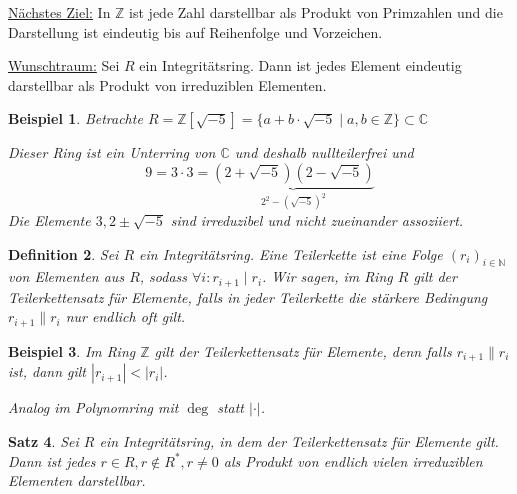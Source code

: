 \documentclass[a4paper,12pt,numbers=noenddot,parskip=full]{scrartcl}
\newcommand{\setN}{\mathbb{N}}
\newcommand{\setZ}{\mathbb{Z}}
\newcommand{\setC}{\mathbb{C}}
\newcommand{\abs}[1]{{\left| #1 \right|}}
\newcommand{\heading}{\underline}
\theoremstyle{dotless}
\newtheorem{theorem}{Satz}[section]
\newtheorem{definition}[theorem]{Definition}
\newtheorem{example}[theorem]{Beispiel}
\theoremstyle{remark}
\begin{document}
 	\heading{Nächstes Ziel:} In $\setZ$ ist jede Zahl darstellbar als Produkt von Primzahlen und die Darstellung ist eindeutig bis auf Reihenfolge und Vorzeichen.
 	
 	\heading{Wunschtraum:} Sei $R$ ein Integritätsring. Dann ist jedes Element eindeutig darstellbar als Produkt von irreduziblen Elementen.
 	
 	\begin{example}
 		Betrachte $R = \setZ[\sqrt{-5}] = \{ a + b \cdot \sqrt{-5} \mid a,b \in \setZ \} \subset \setC$
 		
 		Dieser Ring ist ein Unterring von $\setC$ und deshalb nullteilerfrei und
 		\begin{equation*}
 			9 = 3 \cdot 3 = \underbrace{(2 + \sqrt{-5})(2 - \sqrt{-5})}_{2^2 - (\sqrt{-5})^2}
 		\end{equation*}
 		Die Elemente $3, 2 \pm \sqrt{-5}$ sind irreduzibel und nicht zueinander assoziiert.
 	\end{example}
 
 	\begin{definition}
 		Sei $R$ ein Integritätsring. Eine Teilerkette ist eine Folge $(r_i)_{i \in \setN}$ von Elementen aus $R$, sodass $\forall i : r_{i+1} \mid r_i$. Wir sagen, im Ring $R$ gilt der Teilerkettensatz für Elemente, falls in jeder Teilerkette die stärkere Bedingung $r_{i+1} \parallel r_i$ nur endlich oft gilt.
 	\end{definition}
 
 	\begin{example}
 		Im Ring $\setZ$ gilt der Teilerkettensatz für Elemente, denn falls $r_{i+1} \parallel r_i$ ist, dann gilt $\abs{r_{i+1}} < \abs{r_i}$.
 		
 		Analog im Polynomring mit $\deg$ statt $\abs{\cdot}$.
 	\end{example}
 
 	\begin{theorem}
 		Sei $R$ ein Integritätsring, in dem der Teilerkettensatz für Elemente gilt. Dann ist jedes $r \in R, r \notin R^*, r \neq 0$ als Produkt von endlich vielen irreduziblen Elementen darstellbar.
 	\end{theorem}
 
\end{document}
